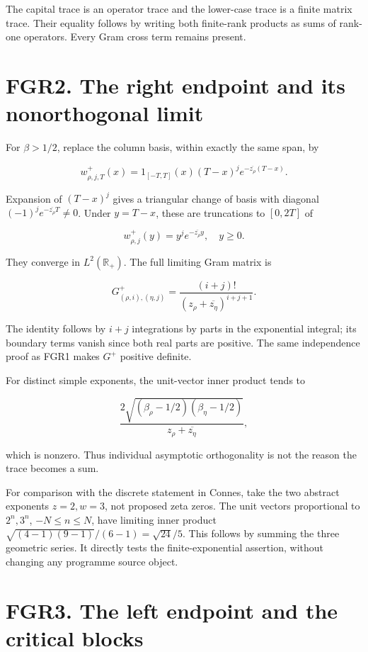 The capital trace is an operator trace and the lower-case trace is a
finite matrix trace. Their equality follows by writing both finite-rank
products as sums of rank-one operators. Every Gram cross term remains
present.

\section{FGR2. The right endpoint and its nonorthogonal
limit}\label{fgr2.-the-right-endpoint-and-its-nonorthogonal-limit}

For \(\beta>1/2\), replace the column basis, within exactly the same
span, by

\[
 w^+_{\rho,j,T}(x)=1_{[-T,T]}(x)(T-x)^j
                         e^{-\overline{z_\rho}(T-x)}.
\tag{FGR2.1}
\]

Expansion of \((T-x)^j\) gives a triangular change of basis with
diagonal \((-1)^j e^{-\overline{z_\rho}T}\ne0\). Under \(y=T-x\), these
are truncations to \([0,2T]\) of

\[
 w^+_{\rho,j}(y)=y^j e^{-\overline{z_\rho}y},\quad y\geq0.
\]

They converge in \(L^2(\mathbb R_+)\). The full limiting Gram matrix is

\[
 G^+_{(\rho,i),(\eta,j)}
 =\frac{(i+j)!}{(z_\rho+\overline{z_\eta})^{i+j+1}}.
\tag{FGR2.2}
\]

The identity follows by \(i+j\) integrations by parts in the exponential
integral; its boundary terms vanish since both real parts are positive.
The same independence proof as FGR1 makes \(G^+\) positive definite.

For distinct simple exponents, the unit-vector inner product tends to

\[
 \frac{2\sqrt{(\beta_\rho-1/2)(\beta_\eta-1/2)}}
 {z_\rho+\overline{z_\eta}},
\tag{FGR2.3}
\]

which is nonzero. Thus individual asymptotic orthogonality is not the
reason the trace becomes a sum.

For comparison with the discrete statement in Connes, take the two
abstract exponents \(z=2,w=3\), not proposed zeta zeros. The unit
vectors proportional to \(2^n,3^n\), \(-N\leq n\leq N\), have limiting
inner product \(\sqrt{(4-1)(9-1)}/(6-1)=\sqrt{24}/5\). This follows by
summing the three geometric series. It directly tests the
finite-exponential assertion, without changing any programme source
object.

\section{FGR3. The left endpoint and the critical
blocks}\label{fgr3.-the-left-endpoint-and-the-critical-blocks}

